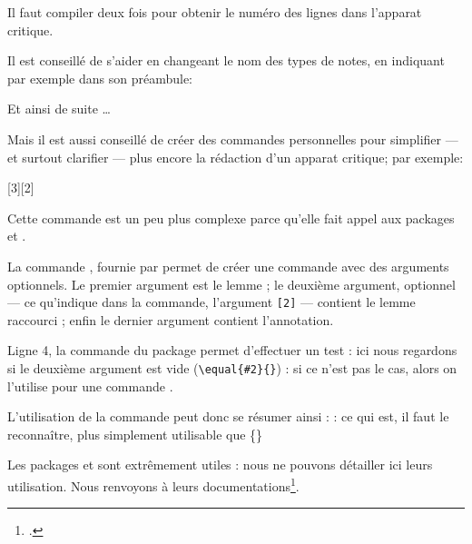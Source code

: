 \begin{attention}
Il faut compiler deux fois pour obtenir le numéro des lignes dans l'apparat critique.
\end{attention}



Il est conseillé de s'aider en changeant le nom des types de notes, en indiquant par exemple dans son préambule: 
\begin{latexcode}
\let\variantes\Afootnote
\let\citations\Bfootnote
\let\eclaircissements\footnoteA
Et ainsi de suite …
\end{latexcode}

Mais il est aussi conseillé de créer des commandes personnelles pour simplifier   --- et surtout clarifier --- plus encore la rédaction d'un apparat critique; par exemple:

\begin{latexcode}
\usepackage{ifthen, xargs}
[3][2]{%
	}
\end{latexcode}

Cette commande est un peu plus complexe parce qu'elle fait appel aux packages  et . 

La commande , fournie par  permet de créer une commande avec des arguments optionnels. Le premier argument est le lemme ; le deuxième argument, optionnel --- ce qu'indique  dans la commande, l'argument \verb=[2]= --- contient le lemme raccourci ; enfin le dernier argument contient l'annotation.

Ligne 4, la commande  du package  permet d'effectuer un test : ici nous regardons si le deuxième argument est vide (\verb=\equal{#2}{}=) : si ce n'est pas le cas, alors on l'utilise pour une commande .

 L'utilisation de la commande peut donc se résumer ainsi :  : ce qui est, il faut le reconnaître, plus simplement utilisable que \{\}

\begin{plusloins}
Les packages  et  sont extrêmement utiles : nous ne pouvons détailler ici leurs utilisation. Nous renvoyons à leurs documentations\footcites{ifthen}{xargs}.
\end{plusloins}





